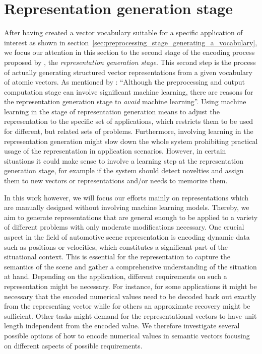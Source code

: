 \section{Representation generation stage}%
\label{sec:representation_generation_stage}

After having created a vector vocabulary suitable for a specific application of interest as shown in section~\ref{sec:preprocessing_stage_generating_a_vocabulary}, we focus our attention in this section to the second stage of the encoding process proposed by \textcite{Gallant2013}, the \emph{representation generation stage}.
This second step is the process of actually generating structured vector representations from a given vocabulary of atomic vectors.
As mentioned by \textcite{Gallant2013}: \enquote{Although the preprocessing and output computation stage can involve significant machine learning, there are reasons for the representation generation stage to \emph{avoid} machine learning}.
Using machine learning in the stage of representation generation means to adjust the representation to the specific set of applications, which restricts them to be used for different, but related sets of problems.
Furthermore, involving learning in the representation generation might slow down the whole system prohibiting practical usage of the representation in application scenarios.
However, in certain situations it could make sense to involve a learning step at the representation generation stage, for example if the system should detect novelties and assign them to new vectors or representations and/or needs to memorize them.

In this work however, we will focus our efforts mainly on representations which are manually designed without involving machine learning models.
Thereby, we aim to generate representations that are general enough to be applied to a variety of different problems with only moderate modifications necessary.
One crucial aspect in the field of automotive scene representation is encoding dynamic data such as positions or velocities, which constitutes a significant part of the situational context.
This is essential for the representation to capture the semantics of the scene and gather a comprehensive understanding of the situation at hand.
Depending on the application, different requirements on such a representation might be necessary.
For instance, for some applications it might be necessary that the encoded numerical values need to be decoded back out exactly from the representing vector while for others an approximate recovery might be sufficient.
Other tasks might demand for the representational vectors to have unit length independent from the encoded value.
We therefore investigate several possible options of how to encode numerical values in semantic vectors focusing on different aspects of possible requirements.

